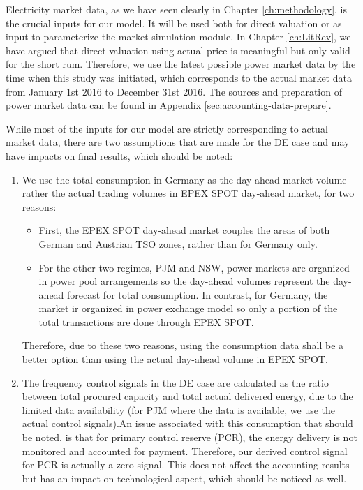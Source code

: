 Electricity market data, as we have seen clearly in Chapter \ref{ch:methodology}, is the crucial inputs for our model. It will be used both for direct valuation or as input to parameterize the market simulation module. In Chapter \ref{ch:LitRev}, we have argued that direct valuation using actual price is meaningful but only valid for the short rum. Therefore, we use the latest possible power market data by the time when this study was initiated, which corresponds to the actual market data from January 1st 2016 to December 31st 2016. The sources and preparation of power market data can be found in Appendix  \ref{sec:accounting-data-prepare}.

While most of the inputs for our model are strictly corresponding to actual market data, there are two assumptions that are made for the DE case and may have impacts on final results, which should be noted:

\begin{enumerate}
	\item We use the total consumption in Germany as the day-ahead market volume rather the actual trading volumes in EPEX SPOT day-ahead market, for two reasons:
	\begin{itemize}
		\item First, the EPEX SPOT day-ahead market couples the areas of both German and Austrian TSO zones, rather than for Germany only.
		\item For the other two regimes, PJM and NSW, power markets are organized in power pool arrangements so the day-ahead volumes represent the day-ahead forecast for total consumption. In contrast, for Germany, the market ir organized in power exchange model so only a portion of the total transactions are done through EPEX SPOT. 
	\end{itemize}
	Therefore, due to these two reasons, using the consumption data shall be a better option than using the actual day-ahead volume in EPEX SPOT.
	\item The frequency control signals in the DE case are calculated as the ratio between total procured capacity and total actual delivered energy, due to the limited data availability (for PJM where the data is available, we use the actual control signals).An issue associated with this consumption that should be noted, is that for primary control reserve (PCR), the energy delivery is not monitored and accounted for payment. Therefore, our derived control signal for PCR is actually a zero-signal. This does not affect the accounting results but has an impact on technological aspect, which should be noticed as well.
\end{enumerate}

